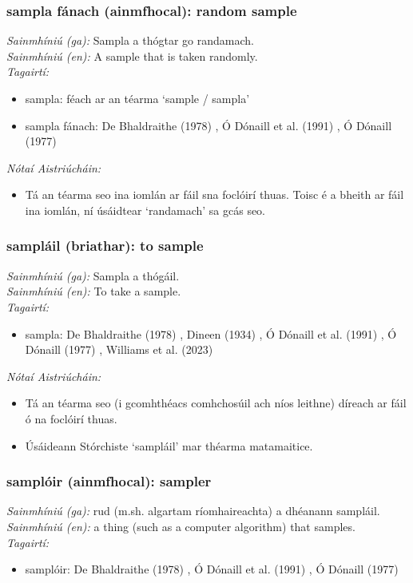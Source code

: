 \subsubsection*{sampla fánach (ainmfhocal): random sample}
 \noindent \textit{Sainmhíniú (ga):} Sampla a thógtar go randamach.
\\
 \noindent \textit{Sainmhíniú (en):} A sample that is taken randomly.
\\
 \noindent \textit{Tagairtí:}
\begin{itemize}
	\item sampla: féach ar an téarma `sample / sampla'
	\item sampla fánach: De Bhaldraithe (1978) \cite{de-bhaldraithe}, Ó Dónaill et al. (1991) \cite{focloir-beag}, Ó Dónaill (1977) \cite{odonaill}
\end{itemize}

 \noindent \textit{Nótaí Aistriúcháin:}
\begin{itemize}
	\item Tá an téarma seo ina iomlán ar fáil sna foclóirí thuas. Toisc é a bheith ar fáil ina iomlán, ní úsáidtear `randamach' sa gcás seo.
\end{itemize}


\subsubsection*{sampláil (briathar): to sample}
 \noindent \textit{Sainmhíniú (ga):} Sampla a thógáil.
\\
 \noindent \textit{Sainmhíniú (en):} To take a sample.
\\
 \noindent \textit{Tagairtí:}
\begin{itemize}
	\item sampla: De Bhaldraithe (1978) \cite{de-bhaldraithe}, Dineen (1934) \cite{dineen}, Ó Dónaill et al. (1991) \cite{focloir-beag}, Ó Dónaill (1977) \cite{odonaill}, Williams et al. (2023) \cite{storchiste}
\end{itemize}

 \noindent \textit{Nótaí Aistriúcháin:}
\begin{itemize}
	\item Tá an téarma seo (i gcomhthéacs comhchosúil ach níos leithne) díreach ar fáil ó na foclóirí thuas.
	\item Úsáideann Stórchiste `sampláil' mar théarma matamaitice.
\end{itemize}


\subsubsection*{samplóir (ainmfhocal): sampler}
 \noindent \textit{Sainmhíniú (ga):} rud (m.sh. algartam ríomhaireachta) a dhéanann sampláil.
\\
 \noindent \textit{Sainmhíniú (en):} a thing (such as a computer algorithm) that samples.
\\
 \noindent \textit{Tagairtí:}
\begin{itemize}
	\item samplóir: De Bhaldraithe (1978) \cite{de-bhaldraithe}, Ó Dónaill et al. (1991) \cite{focloir-beag}, Ó Dónaill (1977) \cite{odonaill}
\end{itemize}

